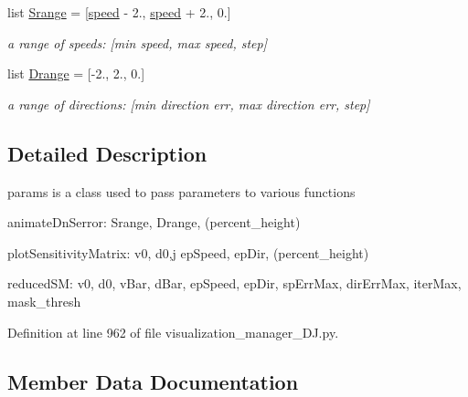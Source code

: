 \begin{DoxyCompactItemize}
list \mbox{\hyperlink{classvisualization__manager___d_j_1_1_visualization_manager_1_1params_a35c7f4aed6589385a5a87fca11b55a90}{Srange}} = \mbox{[}\mbox{\hyperlink{classvisualization__manager___d_j_1_1_visualization_manager_1_1params_af67bd6887a2486bd05116fca8ecbfe08}{speed}} -\/ 2., \mbox{\hyperlink{classvisualization__manager___d_j_1_1_visualization_manager_1_1params_af67bd6887a2486bd05116fca8ecbfe08}{speed}} + 2., 0.\mbox{]}
\begin{DoxyCompactList}\small\item\em a range of speeds\+: \mbox{[}min speed, max speed, step\mbox{]} \end{DoxyCompactList}\item 
list \mbox{\hyperlink{classvisualization__manager___d_j_1_1_visualization_manager_1_1params_af481a6429601c114aa05567f4c169ac1}{Drange}} = \mbox{[}-\/2., 2., 0.\mbox{]}
\begin{DoxyCompactList}\small\item\em a range of directions\+: \mbox{[}min direction err, max direction err, step\mbox{]} \end{DoxyCompactList}\end{DoxyCompactItemize}


\subsection{Detailed Description}
params is a class used to pass parameters to various functions 

animate\+Dn\+Serror\+: Srange, Drange, (percent\+\_\+height)

plot\+Sensitivity\+Matrix\+: v0, d0,j ep\+Speed, ep\+Dir, (percent\+\_\+height)

reduced\+SM\+: v0, d0, v\+Bar, d\+Bar, ep\+Speed, ep\+Dir, sp\+Err\+Max, dir\+Err\+Max, iter\+Max, mask\+\_\+thresh 

Definition at line 962 of file visualization\+\_\+manager\+\_\+\+D\+J.\+py.



\subsection{Member Data Documentation}
\mbox{\label{classvisualization__manager___d_j_1_1_visualization_manager_1_1params_ae89c909d412f7f049eeee5203416f69e}} 
